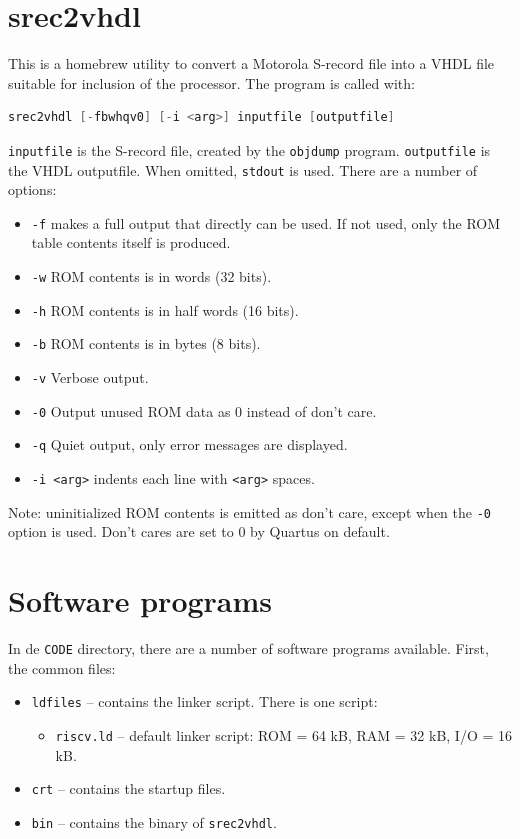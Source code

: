 \documentclass[12pt]{article}
\begin{document}
\section{srec2vhdl}
This is a homebrew utility to convert a Motorola S-record file into a VHDL file suitable for inclusion of the processor. The program is called with:

\begin{lstlisting}[language=c]
srec2vhdl [-fbwhqv0] [-i <arg>] inputfile [outputfile]
\end{lstlisting}

\texttt{inputfile} is the S-record file, created by the \texttt{objdump} program. \texttt{outputfile} is the VHDL outputfile. When omitted, \texttt{stdout} is used. There are a number of options:

\begin{itemize}
\item \texttt{-f} makes a full output that directly can be used. If not used, only the ROM table contents itself is produced.
\item \texttt{-w} ROM contents is in words (32 bits).
\item \texttt{-h} ROM contents is in half words (16 bits).
\item \texttt{-b} ROM contents is in bytes (8 bits).
\item \texttt{-v} Verbose output.
\item \texttt{-0} Output unused ROM data as 0 instead of don't care.
\item \texttt{-q} Quiet output, only error messages are displayed.
\item \texttt{-i <arg>} indents each line with \texttt{<arg>} spaces.
\end{itemize}

Note: uninitialized ROM contents is emitted as don't care, except when the \texttt{-0} option is used. Don't cares are set to 0 by Quartus on default.

\section{Software programs}
In de \texttt{CODE} directory, there are a number of software programs available. First, the common files:

\begin{itemize}
\item \texttt{ldfiles} -- contains the linker script. There is one script:
\begin{itemize}
\item \texttt{riscv.ld} -- default linker script: ROM = 64 kB, RAM = 32 kB, I/O = 16 kB.
\end{itemize}
\item \texttt{crt} -- contains the startup files.
\item \texttt{bin} -- contains the binary of \texttt{srec2vhdl}.
\end{itemize}
\end{document}
